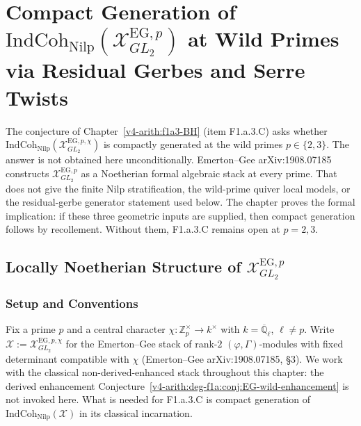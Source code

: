 \chapter[Compact Generation of \(\mathrm{IndCoh}_{\mathrm{Nilp}}(\mathcal{X}^{\mathrm{EG},p}_{GL_{2}})\) at Wild Primes via Residual Gerbes and Serre Twists][Compact generation at wild primes]{Compact Generation of \(\mathrm{IndCoh}_{\mathrm{Nilp}}(\mathcal{X}^{\mathrm{EG},p}_{GL_{2}})\) at Wild Primes via Residual Gerbes and Serre Twists}
\label{v4-arith:w5-g:f1a3-C}

The conjecture of Chapter~\ref{v4-arith:f1a3-BH} (item F1.a.3.C) asks whether
\(\mathrm{IndCoh}_{\mathrm{Nilp}}(\mathcal{X}^{\mathrm{EG},p,\chi}_{GL_{2}})\)
is compactly generated at the wild primes \(p\in\{2,3\}\). The answer is
not obtained here unconditionally. Emerton--Gee arXiv:1908.07185 constructs
\(\mathcal{X}^{\mathrm{EG},p}_{GL_{2}}\) as a Noetherian formal algebraic stack
at every prime. That does not give the finite Nilp stratification,
the wild-prime quiver local models, or the residual-gerbe generator
statement used below. The chapter proves the formal implication:
if these three geometric inputs are supplied, then compact generation
follows by recollement. Without them, F1.a.3.C remains open at
\(p=2,3\).

\section{Locally Noetherian Structure of \(\mathcal{X}^{\mathrm{EG},p}_{GL_{2}}\)}
\label{v4-arith:w5-g:f1a3-C:locally-noetherian}

\subsection{Setup and Conventions}

Fix a prime \(p\) and a central character
\(\chi\colon\mathbb{Z}_{p}^{\times}\to k^{\times}\) with
\(k=\overline{\mathbb{Q}}_{\ell}\), \(\ell\neq p\). Write
\(\mathcal{X}:=\mathcal{X}^{\mathrm{EG},p,\chi}_{GL_{2}}\) for the
Emerton--Gee stack of rank-\(2\) \((\varphi,\Gamma)\)-modules with fixed
determinant compatible with \(\chi\) (Emerton--Gee arXiv:1908.07185,
\S 3). We work with the classical non-derived-enhanced stack
throughout this chapter: the derived enhancement
Conjecture~\ref{v4-arith:deg-f1a:conj:EG-wild-enhancement} is not invoked here.
What is needed for F1.a.3.C is compact generation of
\(\mathrm{IndCoh}_{\mathrm{Nilp}}(\mathcal{X})\) in its classical incarnation.

